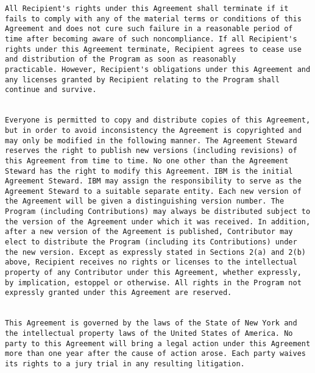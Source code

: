 \begin{verbatim}
All Recipient's rights under this Agreement shall terminate if it
fails to comply with any of the material terms or conditions of this
Agreement and does not cure such failure in a reasonable period of
time after becoming aware of such noncompliance. If all Recipient's
rights under this Agreement terminate, Recipient agrees to cease use
and distribution of the Program as soon as reasonably
practicable. However, Recipient's obligations under this Agreement and
any licenses granted by Recipient relating to the Program shall
continue and survive.  


Everyone is permitted to copy and distribute copies of this Agreement,
but in order to avoid inconsistency the Agreement is copyrighted and
may only be modified in the following manner. The Agreement Steward
reserves the right to publish new versions (including revisions) of
this Agreement from time to time. No one other than the Agreement
Steward has the right to modify this Agreement. IBM is the initial
Agreement Steward. IBM may assign the responsibility to serve as the
Agreement Steward to a suitable separate entity. Each new version of
the Agreement will be given a distinguishing version number. The
Program (including Contributions) may always be distributed subject to
the version of the Agreement under which it was received. In addition,
after a new version of the Agreement is published, Contributor may
elect to distribute the Program (including its Contributions) under
the new version. Except as expressly stated in Sections 2(a) and 2(b)
above, Recipient receives no rights or licenses to the intellectual
property of any Contributor under this Agreement, whether expressly,
by implication, estoppel or otherwise. All rights in the Program not
expressly granted under this Agreement are reserved.  


This Agreement is governed by the laws of the State of New York and
the intellectual property laws of the United States of America. No
party to this Agreement will bring a legal action under this Agreement
more than one year after the cause of action arose. Each party waives
its rights to a jury trial in any resulting litigation.  


\end{verbatim}

\JikesTMFooter
